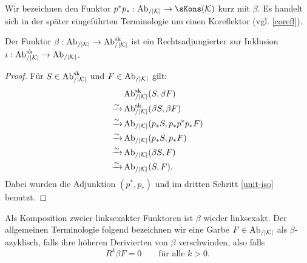 Wir bezeichnen den Funktor $p^*p_*: \AbKr \to \sKons(\K)$ kurz mit
$\beta$. Es handelt sich in der später eingeführten Terminologie um
einen Koreflektor (vgl. \ref{corefl}).
\begin{prop} \label{beta-adjoint}
  Der Funktor $\beta: \AbKr \to \AbKrsk$ ist ein Rechtsadjungierter
  zur Inklusion $\iota: \AbKrsk \to \AbKr$.
\end{prop}
\begin{proof}
  Für $S \in \AbKrsk$ und $F \in \AbKr$ gilt:
  \begin{align*}
    & \AbKrsk(S, \beta F) \\
    \iso & \AbKrsk(\beta S, \beta F) \\
    \iso & \AbKr(p_* S, p_* p^* p_* F) \\
    \iso & \AbKr(p_* S, p_* F) \\
    \iso & \AbKr(\beta S, F) \\
    \iso & \AbKr(S, F).
  \end{align*}
  Dabei wurden die Adjunktion $(p^*, p_*)$ und im dritten Schritt
  \ref{unit-iso} benutzt.
\end{proof}

Als Komposition zweier linksexakter Funktoren ist $\beta$ wieder
linksexakt. Der allgemeinen Terminologie folgend bezeichnen wir eine
Garbe $F \in \AbKr$ als $\beta$-azyklisch, falls ihre höheren
Derivierten von $\beta$ verschwinden, also falls
\[ R^k\beta F = 0 \qquad \text{für alle } k > 0.  \]

